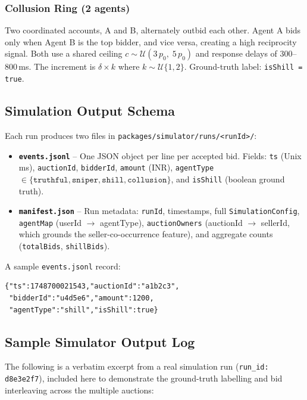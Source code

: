 \documentclass[11pt]{article}
\begin{document}
\subsubsection{Collusion Ring (2 agents)}
Two coordinated accounts, A and B, alternately outbid each other.
Agent A bids only when Agent B is the top bidder, and vice versa, creating
a high reciprocity signal. Both use a shared ceiling
$c \sim \mathcal{U}(3\,p_0,\; 5\,p_0)$ and response delays of
300--800\,ms. The increment is $\delta \times k$ where
$k \sim \mathcal{U}\{1, 2\}$. Ground-truth label: \texttt{isShill = true}.

\subsection{Simulation Output Schema}

Each run produces two files in \texttt{packages/simulator/runs/<runId>/}:

\begin{itemize}
    \item \textbf{\texttt{events.jsonl}} -- One JSON object per line per
      accepted bid. Fields: \texttt{ts} (Unix ms), \texttt{auctionId},
      \texttt{bidderId}, \texttt{amount} (INR), \texttt{agentType}
      $\in \{\texttt{truthful}, \texttt{sniper}, \texttt{shill},
      \texttt{collusion}\}$, and \texttt{isShill} (boolean ground truth).
    \item \textbf{\texttt{manifest.json}} -- Run metadata: \texttt{runId},
      timestamps, full \texttt{SimulationConfig}, \texttt{agentMap}
      (userId $\to$ agentType), \texttt{auctionOwners}
      (auctionId $\to$ sellerId, which grounds the seller-co-occurrence
      feature), and aggregate counts (\texttt{totalBids},
      \texttt{shillBids}).
\end{itemize}

A sample \texttt{events.jsonl} record:
\begin{lstlisting}[language={}]
{"ts":1748700021543,"auctionId":"a1b2c3",
 "bidderId":"u4d5e6","amount":1200,
 "agentType":"shill","isShill":true}
\end{lstlisting}

\subsection{Sample Simulator Output Log}

The following is a verbatim excerpt from a real simulation run
(\texttt{run\_id: d8e3e2f7}), included here to demonstrate the
ground-truth labelling and bid interleaving across the multiple auctions:
\end{document}

